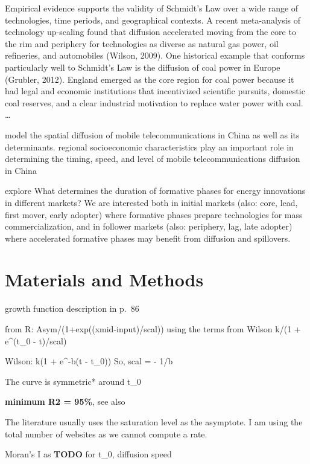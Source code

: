 \documentclass[
  authoryear,
  preprint,
  3p]{elsarticle}
\begin{document}
\citet{leibowicz2016representing} Empirical evidence supports the
validity of Schmidt's Law over a wide range of technologies, time
periods, and geographical contexts. A recent meta-analysis of technology
up-scaling found that diffusion accelerated moving from the core to the
rim and periphery for technologies as diverse as natural gas power, oil
refineries, and automobiles (Wilson, 2009). One historical example that
conforms particularly well to Schmidt's Law is the diffusion of coal
power in Europe (Grubler, 2012). England emerged as the core region for
coal power because it had legal and economic institutions that
incentivized scientific pursuits, domestic coal reserves, and a clear
industrial motivation to replace water power with coal. \ldots{}

\citet{ding2010modeling} model the spatial diffusion of mobile
telecommunications in China as well as its determinants. regional
socioeconomic characteristics play an important role in determining the
timing, speed, and level of mobile telecommunications diffusion in China

\citet{bento2018time} explore What determines the duration of formative
phases for energy innovations in different markets? We are interested
both in initial markets (also: core, lead, first mover, early adopter)
where formative phases prepare technologies for mass commercialization,
and in follower markets (also: periphery, lag, late adopter) where
accelerated formative phases may benefit from diffusion and spillovers.

\hypertarget{sec3}{%
\section{Materials and Methods}\label{sec3}}

\citet{wilson201281} growth function description in p.~86

from R: Asym/(1+exp((xmid-input)/scal)) using the terms from Wilson k/(1
+ e\^{}(t\_0 - t)/scal)

Wilson: k(1 + e\^{}-b(t - t\_0)) So, scal = - 1/b

The curve is symmetric* around t\_0

\textbf{minimum R2 = 95\%}, see also \citet{grubler1990rise}

The literature usually uses the saturation level as the asymptote. I am
using the total number of websites as we cannot compute a rate.

Moran's I as \citet{ding2010modeling} \textbf{TODO} for t\_0, diffusion
speed
\end{document}
